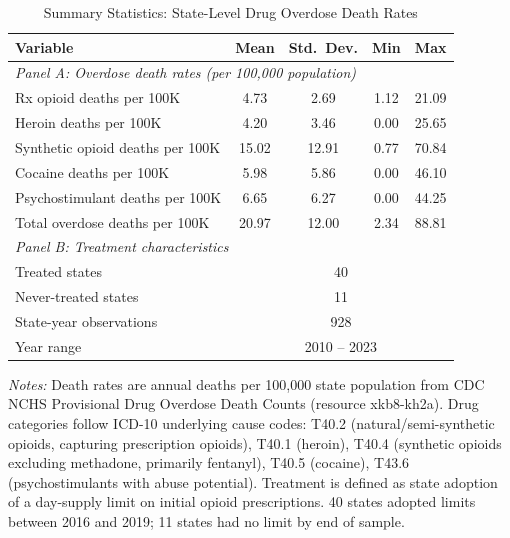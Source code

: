 \begin{table}[H]
\centering
\caption{Summary Statistics: State-Level Drug Overdose Death Rates}
\begin{threeparttable}
\begin{tabular}{lcccc}
\toprule
Variable & Mean & Std.\ Dev. & Min & Max \\
\midrule
\multicolumn{5}{l}{\textit{Panel A: Overdose death rates (per 100,000 population)}} \\[3pt]
Rx opioid deaths per 100K & 4.73 & 2.69 & 1.12 & 21.09 \\
Heroin deaths per 100K & 4.20 & 3.46 & 0.00 & 25.65 \\
Synthetic opioid deaths per 100K & 15.02 & 12.91 & 0.77 & 70.84 \\
Cocaine deaths per 100K & 5.98 & 5.86 & 0.00 & 46.10 \\
Psychostimulant deaths per 100K & 6.65 & 6.27 & 0.00 & 44.25 \\
Total overdose deaths per 100K & 20.97 & 12.00 & 2.34 & 88.81 \\
\midrule
\multicolumn{5}{l}{\textit{Panel B: Treatment characteristics}} \\[3pt]
Treated states & \multicolumn{4}{c}{40} \\
Never-treated states & \multicolumn{4}{c}{11} \\
State-year observations & \multicolumn{4}{c}{928} \\
Year range & \multicolumn{4}{c}{2010 -- 2023} \\
\bottomrule
\end{tabular}
\begin{tablenotes}[flushleft]
\small
\item \textit{Notes:} Death rates are annual deaths per 100,000 state population from CDC NCHS Provisional Drug Overdose Death Counts (resource xkb8-kh2a). Drug categories follow ICD-10 underlying cause codes: T40.2 (natural/semi-synthetic opioids, capturing prescription opioids), T40.1 (heroin), T40.4 (synthetic opioids excluding methadone, primarily fentanyl), T40.5 (cocaine), T43.6 (psychostimulants with abuse potential). Treatment is defined as state adoption of a day-supply limit on initial opioid prescriptions. 40 states adopted limits between 2016 and 2019; 11 states had no limit by end of sample.
\end{tablenotes}
\end{threeparttable}
\label{tab:summary}
\end{table}
